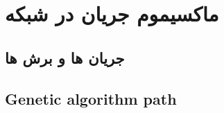  \chapter[ماکسیموم جریان در شبکه]{ماکسیموم جریان در شبکه}
	\section[جریان ها و برش ها]{جریان ها و برش ها}
	\section[\LR{Genetic algorithm path}]{Genetic algorithm path}
	\section[]{\LR{Labeling algorithm}}
